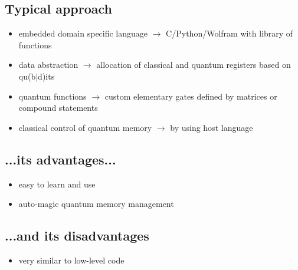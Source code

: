 \documentclass{beamer}
\begin{document}
\subsection{Typical approach}
\begin{frame}{\insertsection}{\insertsubsection}
	\begin{itemize}
		\item embedded domain specific language $\rightarrow$ 
		C/Python/Wolfram 
		with library of functions
		\item data abstraction $\rightarrow$ allocation of classical and quantum registers based on qu(b$|$d)its
		\item quantum functions $\rightarrow$ custom elementary gates defined by matrices or compound statements
		\item classical control of quantum memory $\rightarrow$ by using host language
	\end{itemize}
\end{frame}

\subsection{...its advantages...}
\begin{frame}{\insertsection}{\insertsubsection}
	\begin{itemize}
        \item easy to learn and use
		\item auto-magic quantum memory management
	\end{itemize}
\end{frame}

\subsection{...and its disadvantages}
\begin{frame}{\insertsection}{\insertsubsection}
    \begin{itemize}
        \item very similar to low-level code
    \end{itemize}
\end{frame}
\end{document}
